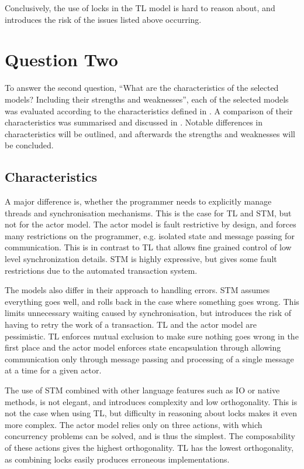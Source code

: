Conclusively, the use of locks in the \ac{TL} model is hard to reason about, and introduces the risk of the issues listed above occurring. 

\section{Question Two}
To answer the second question, ``What are the characteristics of the selected models? Including their strengths and weaknesses'', each of the selected models was evaluated according to the characteristics defined in . A comparison of their characteristics was summarised and discussed in . Notable differences in characteristics will be outlined, and afterwards the strengths and weaknesses will be concluded.

\subsection{Characteristics}
A major difference is, whether the programmer needs to explicitly manage threads and synchronisation mechanisms. This is the case for \ac{TL} and \ac{STM}, but not for the actor model. The actor model is fault restrictive by design, and forces many restrictions on the programmer, e.g. isolated state and message passing for communication. This is in contrast to \ac{TL} that allows fine grained control of low level synchronization details. \ac{STM} is highly expressive, but gives some fault restrictions due to the automated transaction system. 

The models also differ in their approach to handling errors. \ac{STM} assumes everything goes well, and rolls back in the case where something goes wrong. This limits unnecessary waiting caused by synchronisation, but introduces the risk of having to retry the work of a transaction. \ac{TL} and the actor model are pessimistic. \ac{TL} enforces mutual exclusion to make sure nothing goes wrong in the first place and the actor model enforces state encapsulation through allowing communication only through message passing and processing of a single message at a time for a given actor.

The use of \ac{STM} combined with other language features such as \ac{IO} or native methods, is not elegant, and introduces complexity and low orthogonality. This is not the case when using \ac{TL}, but difficulty in reasoning about locks makes it even more complex. The actor model relies only on three actions, with which concurrency problems can be solved, and is thus the simplest. The composability of these actions gives the highest orthogonality. \ac{TL} has the lowest orthogonality, as combining locks easily produces erroneous implementations.

